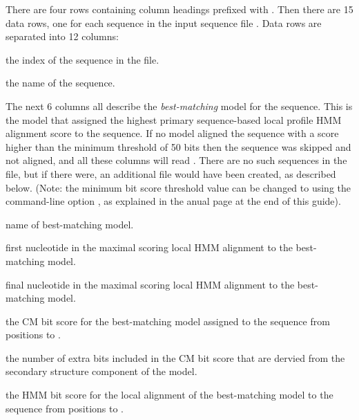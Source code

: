 There are four rows containing column headings prefixed with
\prog{\#}. Then there are 15 data rows, one for each sequence in the
input sequence file . Data rows are
separated into 12 columns:

\begin{wideitem}
\item[\emprog{idx}] the index of the sequence in the file.

\item[\emprog{sequence name}] the name of the sequence.
\end{wideitem}

The next 6 columns all describe the \emph{best-matching} model for the
sequence. This is the model that assigned the highest primary
sequence-based local profile HMM alignment score to the sequence.  If
no model aligned the sequence with a score higher than the minimum
threshold of 50 bits then the sequence was skipped and not aligned,
and all these columns will read \prog{-}. There are no such sequences
in the  file, but if there were, an additional
 file would have been created, as described
below. (Note: the minimum bit score
threshold value can be changed to  using the
 command-line option , as explained in
the  anual page at the end of this guide).

\begin{wideitem}
\item[\emprog{model name}] name of best-matching model.

\item[\emprog{beg}] first nucleotide in the maximal
  scoring local HMM alignment to the best-matching model.

\item[\emprog{end}] final nucleotide in the maximal
  scoring local HMM alignment to the best-matching model.

\item[\emprog{CM sc}] the CM bit score for the best-matching model
  assigned to the sequence from positions  to .

\item[\emprog{struct}] the number of extra bits included in the
  CM bit score that are dervied from the secondary structure component
  of the model.

\item[\emprog{HMM sc}] the HMM bit score for the local alignment of
  the best-matching model to the sequence from positions  to
  .
\end{wideitem}

